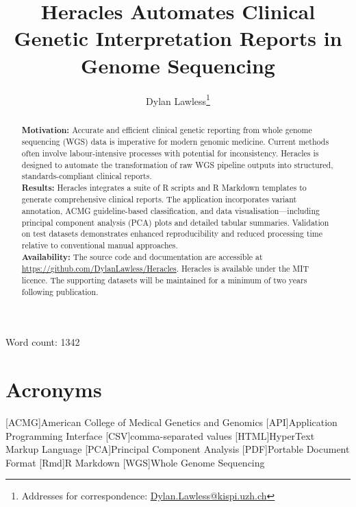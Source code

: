 
\usepackage[printonlyused,withpage,nohyperlinks]{acronym}
 

\title{Heracles Automates Clinical Genetic Interpretation Reports in Genome Sequencing}	

\author[1]{Dylan Lawless\thanks{Addresses for correspondence: \href{mailto:Dylan.Lawless@kispi.uzh.ch}{Dylan.Lawless@kispi.uzh.ch}}}


\maketitle
\justify

Word count: 1342

\begin{abstract}
\noindent \textbf{Motivation:} Accurate and efficient clinical genetic reporting from whole genome sequencing (WGS) data is imperative for modern genomic medicine. Current methods often involve labour-intensive processes with potential for inconsistency. Heracles is designed to automate the transformation of raw WGS pipeline outputs into structured, standards-compliant clinical reports.\\[1ex]
\noindent \textbf{Results:}  Heracles integrates a suite of R scripts and R Markdown templates to generate comprehensive clinical reports. The application incorporates variant annotation, ACMG guideline-based classification, and data visualisation—including principal component analysis (PCA) plots and detailed tabular summaries. Validation on test datasets demonstrates enhanced reproducibility and reduced processing time relative to conventional manual approaches.\\[1ex]
\noindent \textbf{Availability:}  The source code and documentation are accessible at \url{https://github.com/DylanLawless/Heracles}. Heracles is available under the MIT licence. The supporting datasets will be maintained for a minimum of two years following publication.
\end{abstract}
\clearpage

\section*{Acronyms}
\renewenvironment{description} %
{\list{}{\labelwidth0pt\itemindent-\leftmargin
    \parsep-1em\itemsep0pt\let\makelabel\descriptionlabel}}
               {\endlist}
\begin{acronym} 
[ACMG]{American College of Medical Genetics and Genomics}
[API]{Application Programming Interface}
[CSV]{comma-separated values}
[HTML]{HyperText Markup Language}
[PCA]{Principal Component Analysis}
[PDF]{Portable Document Format}
[Rmd]{R Markdown}
[WGS]{Whole Genome Sequencing}
\end{acronym} 

